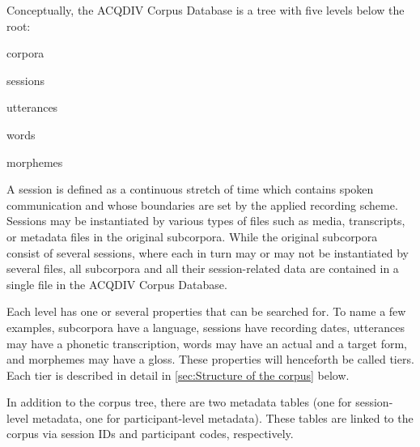 \documentclass[a4paper, 11pt]{book}
\begin{document}
Conceptually, the ACQDIV Corpus Database is a tree with five levels below the root: 

\begin{itemize*}
	\item corpora
	\item sessions
	\item utterances
	\item words
	\item morphemes
\end{itemize*}

A session is defined as a continuous stretch of time which contains spoken communication and whose boundaries are set by the applied recording scheme. Sessions may be instantiated by various types of files such as media, transcripts, or metadata files in the original subcorpora. While the original subcorpora consist of several sessions, where each in turn may or may not be instantiated by several files, all subcorpora and all their session-related data are contained in a single file in the ACQDIV Corpus Database. 

Each level has one or several properties that can be searched for. To name a few examples, subcorpora have a language, sessions have recording dates, utterances may have a phonetic transcription, words may have an actual and a target form, and morphemes may have a gloss. These properties will henceforth be called tiers. Each tier is described in detail in \autoref{sec:Structure of the corpus} below. 

In addition to the corpus tree, there are two metadata tables (one for session-level metadata, one for participant-level metadata). These tables are linked to the corpus via session IDs and participant codes, respectively. 

%
\end{document}
